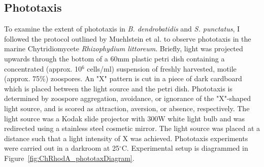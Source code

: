 \subsection{Phototaxis}
To examine the extent of phototaxis in \textit{B. dendrobatidis} and \textit{S. punctatus}, I followed the protocol outlined by Muehlstein et al.\nocite{Muehlstein1987} to observe phototaxis in the marine Chytridiomycete \textit{Rhizophydium littoreum}. Briefly, light was projected upwards through the bottom of a 60mm plastic petri dish containing a concentrated (approx. 10$^{6}$ cells/ml) suspension of freshly harvested, motile (approx. 75\%) zoospores. An "X" pattern is cut in a piece of dark cardboard which is placed between the light source and the petri dish. Phototaxis is determined by zoospore aggregation, avoidance, or ignorance of the "X"-shaped light source, and is scored as attraction, aversion, or absence, respectively. The light source was a Kodak slide projector with 300W white light bulb and was redirected using a stainless steel cosmetic mirror. The light source was placed at a distance such that a light intensity of X was achieved. Phototaxis experiments were carried out in a darkroom at 25$^{\circ}$C. Experimental setup is diagrammed in Figure~\ref{fig:ChRhodA_phototaxDiagram}.\\ 
